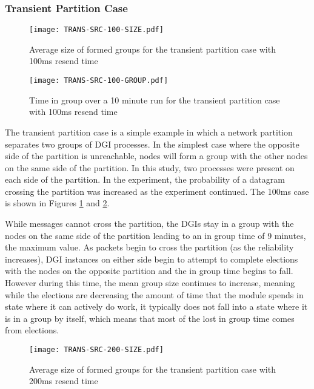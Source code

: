 \subsubsection{Transient Partition Case}

\begin{figure}[!h]
\centering
\texttt{[image: TRANS-SRC-100-SIZE.pdf]}
\caption{Average size of formed groups for the transient partition case with 100ms resend time}
\label{fig:MGS-SRC-TRANS-100}
\end{figure}

\begin{figure}[!h]
\centering
\texttt{[image: TRANS-SRC-100-GROUP.pdf]}
\caption{Time in group over a 10 minute run for the transient partition case with 100ms resend time}
\label{fig:IGT-SRC-TRANS-100}
\end{figure}

The transient partition case is a simple example in which a network partition separates two groups of DGI processes. In the simplest case where the opposite side of the partition is unreachable, nodes will form a group with the other nodes on the same side of the partition.
In this study, two processes were present on each side of the partition.
In the experiment, the probability of a datagram crossing the partition was increased as the experiment continued.
The 100ms case is shown in Figures \ref{fig:MGS-SRC-TRANS-100} and \ref{fig:IGT-SRC-TRANS-100}.

While messages cannot cross the partition, the DGIs stay in a group with the
nodes on the same side of the partition leading to an in group time of 9 minutes,
the maximum value. As packets begin to cross the partition (as the reliability
increases), DGI instances on either side begin to attempt to complete elections
with the nodes on the opposite partition and the in group time begins to fall.
However during this time, the mean group size continues to increase, meaning
while the elections are decreasing the amount of time that the module spends in
state where it can actively do work, it typically does not fall into a state
where it is in a group by itself, which means that most of the lost in group
time comes from elections.

\begin{figure}[!h]
\centering
\texttt{[image: TRANS-SRC-200-SIZE.pdf]}
\caption{Average size of formed groups for the transient partition case with 200ms resend time}
\label{fig:MGS-SRC-TRANS-200}
\end{figure}

